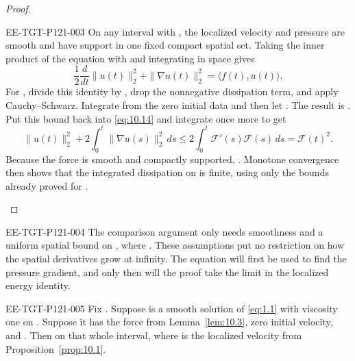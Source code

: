 \begin{proof}
\begin{EESegment}{EE-TGT-P121-003}
On any interval  with , the
localized velocity and pressure are smooth and have support in one fixed compact spatial
set. Taking the inner product of the equation with  and
integrating in space gives
\begin{equation}
  \frac12\frac{d}{dt}\|u(t)\|_2^2+\|\nabla u(t)\|_2^2
  =\langle f(t),u(t)\rangle.
\tag{10.14}\label{eq:10.14}
\end{equation}
For , divide this identity by
, drop the nonnegative dissipation
term, and apply Cauchy--Schwarz. Integrate from the zero initial data and then let
. The result is
. Put this bound back into
\eqref{eq:10.14} and integrate once more to get
\[
  \|u(t)\|_2^2+2\int_0^t\|\nabla u(s)\|_2^2\,ds
  \leq 2\int_0^t\mathcal F'(s)\mathcal F(s)\,ds
  =\mathcal F(t)^2.
\]
Because the force is smooth and compactly supported,
. Monotone convergence then shows that the
integrated dissipation on \NSi{NS-F-P121-021}{[0,1)} is finite, using only the bounds
already proved for .
\end{EESegment}
\end{proof}

\begin{EESegment}{EE-TGT-P121-004}
The comparison argument only needs smoothness and a uniform spatial
 bound on , where
. These assumptions put no restriction on how the spatial
derivatives grow at infinity. The equation will first be used to find the pressure gradient,
and only then will the proof take the limit in the localized energy identity.
\end{EESegment}

\begin{lemma}\label{lem:10.5}
\begin{EESegment}{EE-TGT-P121-005}
Fix . Suppose  is a smooth solution
of \eqref{eq:1.1} with viscosity one on
. Suppose it has the force
 from Lemma~\ref{lem:10.3}, zero initial velocity, and
. Then
 on that whole interval, where
 is the localized velocity from Proposition~\ref{prop:10.1}.
\end{EESegment}
\end{lemma}

